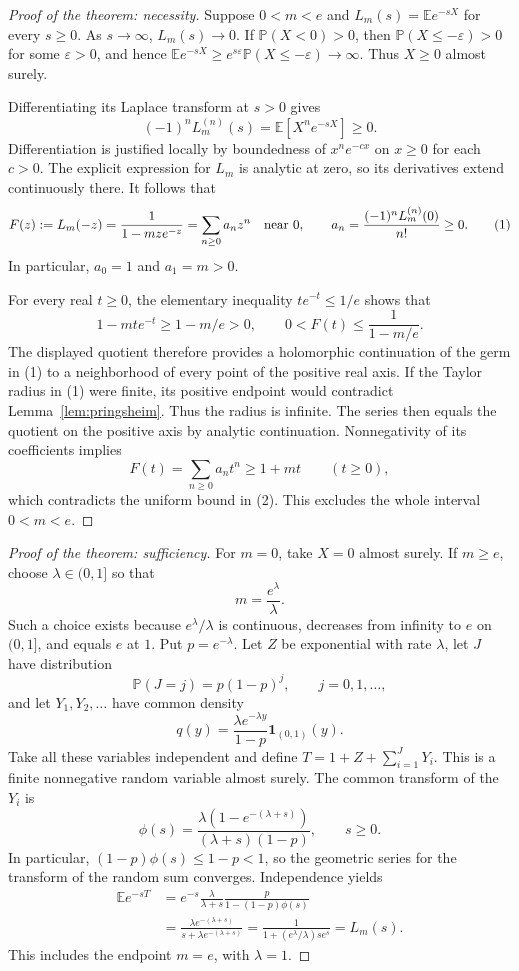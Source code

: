 \documentclass[11pt]{article}
\newcommand{\E}{\mathbb E}
\newcommand{\Pp}{\mathbb P}
\begin{document}
\begin{proof}[Proof of the theorem: necessity]
Suppose $0<m<e$ and $L_m(s)=\E e^{-sX}$ for every $s\geq0$.
As $s\to\infty$, $L_m(s)\to0$. If $\Pp(X<0)>0$, then
$\Pp(X\leq-\varepsilon)>0$ for some $\varepsilon>0$, and hence
$\E e^{-sX}\geq e^{s\varepsilon}\Pp(X\leq-\varepsilon)\to\infty$.
Thus $X\geq0$ almost surely.

Differentiating its Laplace transform at $s>0$ gives
\[
 (-1)^nL_m^{(n)}(s)=\E[X^ne^{-sX}]\geq0.
\]
Differentiation is justified locally by boundedness of
$x^ne^{-cx}$ on $x\geq0$ for each $c>0$.
The explicit expression for $L_m$ is analytic at zero, so its
derivatives extend continuously there. It follows that
\[
 F(z):=L_m(-z)=\frac{1}{1-mze^{-z}}
       =\sum_{n\geq0}a_nz^n
 \quad\hbox{near }0,\qquad
 a_n=\frac{(-1)^nL_m^{(n)}(0)}{n!}\geq0.
 \tag{1}
\]
In particular, $a_0=1$ and $a_1=m>0$.

For every real $t\geq0$, the elementary inequality $te^{-t}\leq1/e$
shows that
\[
 1-mte^{-t}\geq1-m/e>0,\qquad
 0<F(t)\leq\frac{1}{1-m/e}.                 \tag{2}
\]
The displayed quotient therefore provides a holomorphic continuation
of the germ in (1) to a neighborhood of every point of the positive
real axis. If the Taylor radius in (1) were finite, its positive
endpoint would contradict Lemma~\ref{lem:pringsheim}. Thus the radius
is infinite. The series then equals the quotient on the positive
axis by analytic continuation. Nonnegativity of its coefficients
implies
\[
 F(t)=\sum_{n\geq0}a_nt^n\geq1+mt\qquad(t\geq0),
\]
which contradicts the uniform bound in (2). This excludes the whole
interval $0<m<e$.
\end{proof}

\begin{proof}[Proof of the theorem: sufficiency]
For $m=0$, take $X=0$ almost surely. If $m\geq e$, choose
$\lambda\in(0,1]$ so that
\[
 m=\frac{e^\lambda}{\lambda}.
\]
Such a choice exists because $e^\lambda/\lambda$ is continuous,
decreases from infinity to $e$ on $(0,1]$, and equals $e$ at $1$.
Put $p=e^{-\lambda}$. Let $Z$ be exponential with rate $\lambda$,
let $J$ have distribution
\[
 \Pp(J=j)=p(1-p)^j,\qquad j=0,1,\ldots,
\]
and let $Y_1,Y_2,\ldots$ have common density
\[
 q(y)=\frac{\lambda e^{-\lambda y}}{1-p}
             \boldsymbol{1}_{(0,1)}(y).
\]
Take all these variables independent and define
$T=1+Z+\sum_{i=1}^JY_i$. This is a finite nonnegative random
variable almost surely. The common transform of the $Y_i$ is
\[
 \phi(s)=\frac{\lambda(1-e^{-(\lambda+s)})}
                    {(\lambda+s)(1-p)},\qquad s\geq0 .
\]
In particular, $(1-p)\phi(s)\leq1-p<1$, so the geometric series
for the transform of the random sum converges. Independence yields
\begin{align*}
 \E e^{-sT}
 &=e^{-s}\frac{\lambda}{\lambda+s}
           \frac{p}{1-(1-p)\phi(s)}\\
 &=\frac{\lambda e^{-(\lambda+s)}}
             {s+\lambda e^{-(\lambda+s)}}
  =\frac{1}{1+(e^\lambda/\lambda)se^s}
  =L_m(s).
\end{align*}
This includes the endpoint $m=e$, with $\lambda=1$.
\end{proof}
\end{document}

